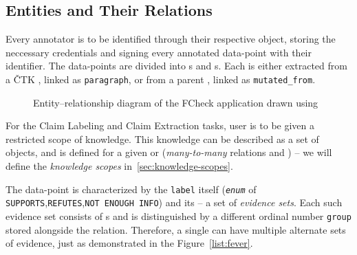 \subsection{Entities and Their Relations}

Every annotator is to be identified through their respective  object, storing the neccessary credentials and signing every annotated data-point with their identifier. The data-points are divided into s and s. Each  is either extracted from a \textsf{ČTK} , linked as \texttt{paragraph}, or from a parent , linked as \texttt{mutated\_from}.

\begin{figure}[H]


\caption{Entity--relationship diagram of the {\textsf{FCheck}} application drawn using \cite{drawsql}}
\label{fig:er}
\end{figure}%

For the Claim Labeling and Claim Extraction tasks, user is to be given a restricted scope of knowledge. This knowledge can be described as a set of  objects, and is defined for a given  or  (\textit{many-to-many} relations  and ) -- we will define the \textit{knowledge scopes} in~\ref{sec:knowledge-scopes}.

The  data-point is characterized by the \texttt{label} itself (\texttt{\textit{enum}} of \texttt{SUPPORTS},\texttt{REFUTES},\texttt{NOT ENOUGH INFO}) and its  -- a set of \textit{evidence sets}. Each such evidence set consists of s and is distinguished by a different ordinal number \texttt{group} stored alongside the  relation. Therefore, a single  can have multiple alternate sets of evidence, just as demonstrated in the Figure~\ref{list:fever}. 

